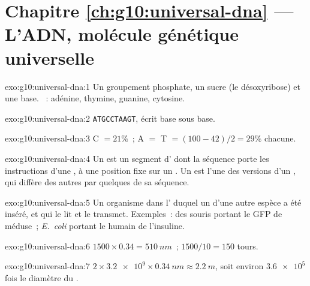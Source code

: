 \section*{Chapitre \ref{ch:g10:universal-dna} --- L'ADN, molécule génétique universelle}

\begin{solution}{exo:g10:universal-dna:1}
Un groupement phosphate, un sucre (le désoxyribose) et une base.
~: adénine, thymine, guanine, cytosine.
\end{solution}

\begin{solution}{exo:g10:universal-dna:2}
\texttt{ATGCCTAAGT}, écrit base sous base.
\end{solution}

\begin{solution}{exo:g10:universal-dna:3}
C $= 21\%$~; A $=$ T $= (100 - 42)/2 = 29\%$ chacune.
\end{solution}

\begin{solution}{exo:g10:universal-dna:4}
Un  est un segment d' dont la séquence porte les instructions
d'une , à une position fixe sur un . Un  est
l'une des versions d'un , qui diffère des autres par quelques 
de sa séquence.
\end{solution}

\begin{solution}{exo:g10:universal-dna:5}
Un organisme dans l' duquel un  d'une autre espèce a été
inséré, et qui le lit et le transmet. Exemples~: des souris portant le
 GFP de méduse~; \emph{E.~coli} portant le  humain de
l'insuline.
\end{solution}

\begin{solution}{exo:g10:universal-dna:6}
$1500 \times 0.34 = \qty{510}{nm}$~; $1500/10 = 150$ tours.
\end{solution}

\begin{solution}{exo:g10:universal-dna:7}
$2 \times \num{3.2e9} \times \qty{0.34}{nm} \approx \qty{2.2}{m}$, soit
environ $\num{3.6e5}$ fois le diamètre du .
\end{solution}

